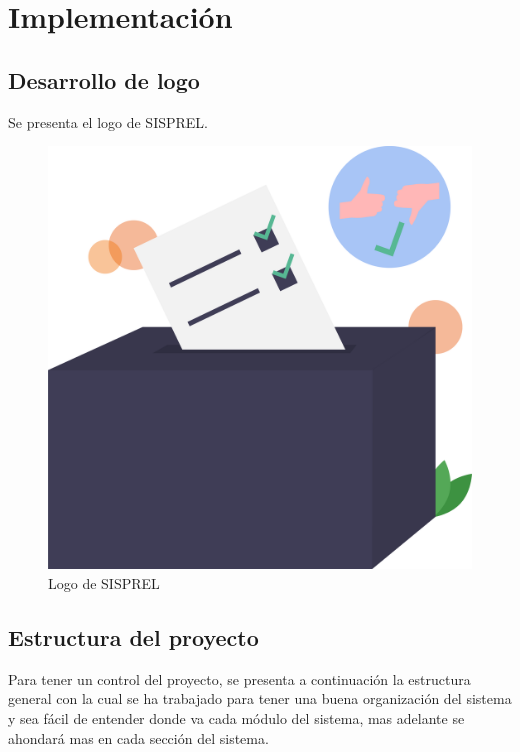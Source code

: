 \chapter{Implementación} 
\vspace*{2cm}

\section{Desarrollo de logo}
Se presenta el logo de SISPREL.
\begin{figure}[!htb]
    \centering
    \includegraphics[scale=0.25]{TT/img/sisprel.png}
    \caption{Logo de SISPREL}
    \label{graphic:SISPRELLogo}    
\end{figure}

\section{Estructura del proyecto}
Para tener un control del proyecto, se presenta a continuación la estructura general con la cual se ha trabajado para tener una buena organización del sistema y sea fácil de entender donde va cada módulo del sistema, mas adelante se ahondará mas en cada sección del sistema.

